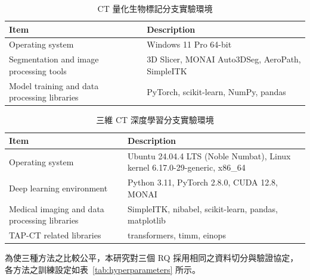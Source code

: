 \begin{ZhChapter}
\begin{table}[htbp]
\centering
\caption{CT 量化生物標記分支實驗環境}
\label{tab:quant_software}
\begingroup
\renewcommand{\arraystretch}{1.45}
\begin{tabularx}{0.95\textwidth}{|>{\centering\arraybackslash}p{}|>{\raggedright\arraybackslash}X|}
\hline
\textbf{Item} & \textbf{Description} \\
\hline
Operating system & Windows 11 Pro 64-bit \\
\hline
Segmentation and image processing tools & 3D Slicer, MONAI Auto3DSeg, AeroPath, SimpleITK \\
\hline
Model training and data processing libraries & PyTorch, scikit-learn, NumPy, pandas \\
\hline
\end{tabularx}
\endgroup
\end{table}

\begin{table}[htbp]
\centering
\caption{三維 CT 深度學習分支實驗環境}
\label{tab:deep_software}
\begingroup
\renewcommand{\arraystretch}{1.45}
\begin{tabularx}{0.95\textwidth}{|>{\centering\arraybackslash}p{}|>{\raggedright\arraybackslash}X|}
\hline
\textbf{Item} & \textbf{Description} \\
\hline
Operating system & Ubuntu 24.04.4 LTS (Noble Numbat), Linux kernel 6.17.0-29-generic, x86\_64 \\
\hline
Deep learning environment & Python 3.11, PyTorch 2.8.0, CUDA 12.8, MONAI \\
\hline
Medical imaging and data processing libraries & SimpleITK, nibabel, scikit-learn, pandas, matplotlib \\
\hline
TAP-CT related libraries & transformers, timm, einops \\
\hline
\end{tabularx}
\endgroup
\end{table}

為使三種方法之比較公平，本研究對三個 RQ 採用相同之資料切分與驗證協定，各方法之訓練設定如表~\ref{tab:hyperparameters} 所示。


\end{ZhChapter}
